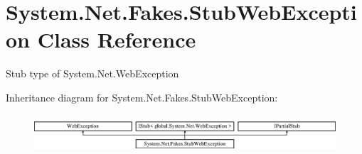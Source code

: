 \hypertarget{class_system_1_1_net_1_1_fakes_1_1_stub_web_exception}{\section{System.\-Net.\-Fakes.\-Stub\-Web\-Exception Class Reference}
\label{class_system_1_1_net_1_1_fakes_1_1_stub_web_exception}
}


Stub type of System.\-Net.\-Web\-Exception 


Inheritance diagram for System.\-Net.\-Fakes.\-Stub\-Web\-Exception\-:\begin{figure}[H]
\begin{center}
\leavevmode
\includegraphics[height=1.452659cm]{class_system_1_1_net_1_1_fakes_1_1_stub_web_exception}
\end{center}
\end{figure}
